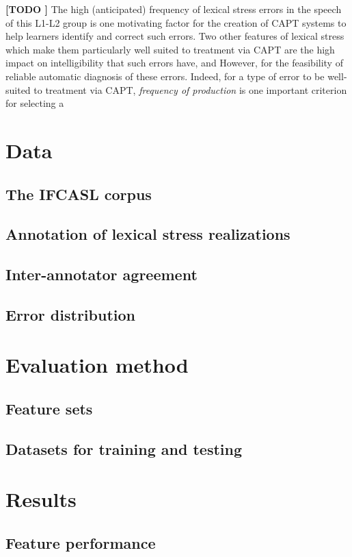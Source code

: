 \documentclass[a4paper]{article}
\newcommand{\TODO}[1]{{\color{red}\textbf{[TODO #1]}}}
\begin{document}
	\TODO{}
	The high (anticipated) frequency of lexical stress errors in the speech of this L1-L2 group is one motivating factor for the creation of CAPT systems to help learners identify and correct such errors.
	Two other features of lexical stress which make them particularly well suited to treatment via CAPT are the high impact on intelligibility that such errors have, and 
	However, for the feasibility of reliable automatic diagnosis of these errors.	
	 Indeed, for a type of error to be well-suited to treatment via CAPT, \textit{frequency of production} is one important criterion for selecting a 
	 
	
	
	\section{Data}
	\label{sec:data}
		\subsection{The IFCASL corpus}
		\subsection{Annotation of lexical stress realizations}
		\subsection{Inter-annotator agreement}
		\subsection{Error distribution}
	
	\section{Evaluation method}
	\label{sec:method}
	    \subsection{Feature sets}
	    \subsection{Datasets for training and testing}

	\section{Results}
	\label{sec:results}
		\subsection{Feature performance}
\end{document}
